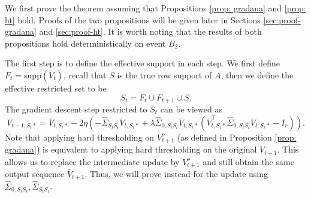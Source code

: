\documentclass[11pt]{article}
\newcommand{\nb}[1]{\textcolor{orange}{\texttt{[#1]}}}
\newcommand{\gsc}[1]{\textcolor{blue}{\texttt{[#1]}}}
\newcommand{\gd}{\overline{V}}
\newcommand{\cI}{{\mathcal{I}}}
\newcommand{\0}{{\mathbf{0}}}
\begin{document}
We first prove the theorem assuming that Propositions \ref{prop: gradana} and \ref{prop: ht} hold. 
Proofs of the two propositions will be given later in Sections \ref{sec:proof-gradana} and \ref{sec:proof-ht}.
It is worth noting that the results of both propositions hold deterministically on event $B_2$.


\par The first step is to define the effective support in each step. We first define $F_t=\mathrm{supp}(\gd_t)$, { recall that $S$ is the true row support of $A$}, then we define the effective restricted set to be 
\begin{equation*}
    S_t=F_t\cup F_{t+1}\cup { S}.
\end{equation*}
The gradient descent step restricted to $S_t$ can be viewed as 
\begin{equation*}
    V_{t+1,S_t*}=\gd_{t,S_t*}-2\eta(-\widehat{\Sigma}_{S_tS_t}\gd_{t,S_t*}+\lambda \widehat{\Sigma}_{0,S_tS_t} \gd_{t,S_t*}(\gd_{t,S_t*}^\top\widehat{\Sigma}_{0,S_tS_t}\gd_{t,S_t*}-I_r)).
\end{equation*}
Note that applying hard thresholding on $V_{t+1}^o$ (as defined in Proposition \ref{prop: gradana}) is equivalent to applying hard thresholding on the original $V_{t+1}$. 
This allows us to replace the intermediate update by $V_{t+1}^o$ and still obtain the same output sequence $\gd_{t+1}$.
Thus, we will prove instead for the update using $\widehat{\Sigma}_{0,S_tS_t}, \widehat{\Sigma}_{S_tS_t}$. 

\end{document}
